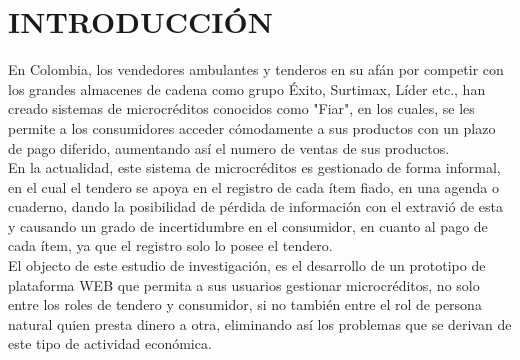 \chapter*{INTRODUCCIÓN}

{En Colombia, los vendedores ambulantes y tenderos en su afán por competir con los grandes almacenes de cadena como grupo Éxito, Surtimax, Líder etc., han creado sistemas de microcréditos conocidos como "Fiar", en los cuales, se les permite a los consumidores acceder cómodamente a sus productos con un plazo de pago diferido, aumentando así el numero de ventas de sus productos.\\

En la actualidad, este sistema de microcréditos es gestionado de forma informal, en el cual el tendero se apoya en el registro de cada ítem fiado, en una agenda o cuaderno, dando la posibilidad de pérdida de información con el extravió de esta y causando un grado de incertidumbre en el consumidor, en cuanto al pago de cada ítem, ya que el registro solo lo posee el tendero.\\

El objecto de este estudio de investigación, es el desarrollo de un prototipo de plataforma WEB que permita a sus usuarios gestionar microcréditos, no solo entre  los roles de tendero y consumidor, si no también entre el rol de persona natural quien presta dinero a otra, eliminando así los problemas que se derivan de este tipo de actividad económica.}